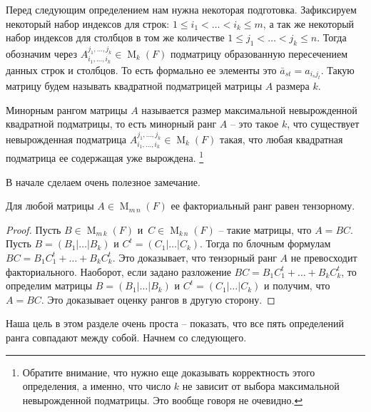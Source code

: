 Перед следующим определением нам нужна некоторая подготовка.
Зафиксируем некоторый набор индексов для строк: $1\leqslant i_1<\ldots<i_k\leqslant m$, а так же некоторый набор индексов для столбцов в том же количестве $1\leqslant j_1<\ldots<j_k\leqslant n$.
Тогда обозначим через $A_{i_1,\ldots,i_k}^{j_1,\ldots,j_k}\in \operatorname{M}_k(F)$ подматрицу образованную пересечением данных строк и столбцов.
То есть формально ее элементы это $\bar a_{st} = a_{i_s j_t}$.
Такую матрицу будем называть квадратной подматрицей матрицы $A$ размера $k$.

\begin{definition}
Минорным рангом матрицы $A$ называется размер максимальной невырожденной квадратной подматрицы, то есть минорный ранг $A$ -- это такое $k$, что существует невырожденная подматрица $A_{i_1,\ldots,i_k}^{j_1,\ldots,j_k}\in \operatorname{M}_k(F)$ такая, что любая квадратная подматрица ее содержащая уже вырождена.%
\footnote{Обратите внимание, что нужно еще доказывать корректность этого определения, а именно, что число $k$ не зависит от выбора максимальной невырожденной подматрицы.
Это вообще говоря не очевидно.}
\end{definition}

В начале сделаем очень полезное замечание.

\begin{claim}
\label{claim::rkFactorTensor}
Для любой матрицы $A\in \operatorname{M}_{m\,n}(F)$ ее факториальный ранг равен тензорному.
\end{claim}
\begin{proof}
Пусть $B\in \operatorname{M}_{m\,k}(F)$ и  $\,C\in\operatorname{M}_{k\,n}(F)$ -- такие матрицы, что $A = BC$.
Пусть $B = (B_1|\ldots|B_k)$ и $C^t = (C_1|\ldots|C_k)$.
Тогда по блочным формулам $BC = B_1 C_1^t + \ldots + B_kC_k^t$.
Это доказывает, что тензорный ранг $A$ не превосходит факториального.
Наоборот, если задано разложение $BC = B_1 C_1^t + \ldots + B_kC_k^t$, то определим матрицы $B = (B_1|\ldots|B_k)$ и $C^t = (C_1|\ldots|C_k)$ и получим, что $A = BC$.
Это доказывает оценку рангов в другую сторону.
\end{proof}


Наша цель в этом разделе очень проста -- показать, что все пять определений  ранга совпадают между собой.
Начнем со следующего.

